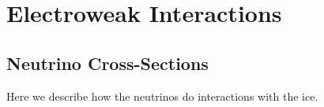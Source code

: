 \section{Electroweak Interactions}
\label{sec:ew-interactions}

\subsection{Neutrino Cross-Sections}
\label{sec:neutrino-xsec}

Here we describe how the neutrinos do interactions with the ice.